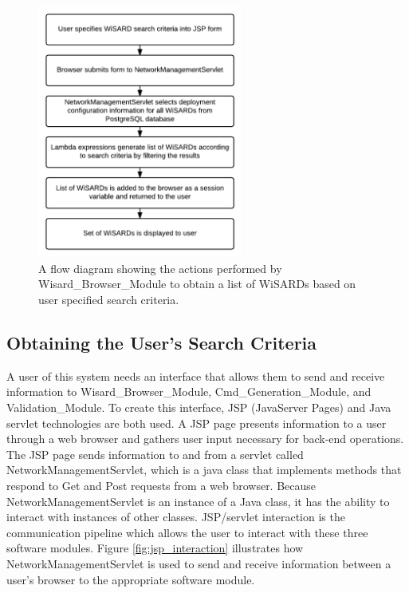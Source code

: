 \begin{figure}[H]
	\centering
	\includegraphics[width=0.6\textwidth]{figures/flow_diagram_wisard_browser.png}
	\caption{A flow diagram showing the actions performed by Wisard\_Browser\_Module to obtain a list of WiSARDs based on user specified search criteria.}
	\label{fig:wisard_browser_flow}
\end{figure}

\subsection{Obtaining the User's Search Criteria}
A user of this system needs an interface that allows them to send and receive information to Wisard\_Browser\_Module, Cmd\_Generation\_Module, and Validation\_Module. To create this interface, JSP (JavaServer Pages) and Java servlet technologies are both used. A JSP page presents information to a user through a web browser and gathers user input necessary for back-end operations. The JSP page sends information to and from a servlet called NetworkManagementServlet, which is a java class that implements methods that respond to Get and Post requests from a web browser. Because NetworkManagementServlet is an instance of a Java class, it has the ability to interact with instances of other classes. JSP/servlet interaction is the communication pipeline which allows the user to interact with these three software modules. Figure \ref{fig:jsp_interaction} illustrates how NetworkManagementServlet is used to send and receive information between a user's browser to the appropriate software module. 


